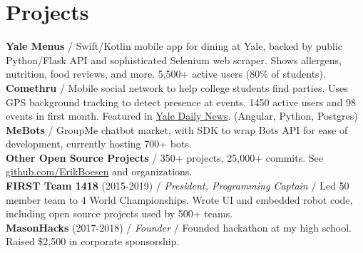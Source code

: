 \documentclass[10pt, a4paper]{article}
\newcommand{\years}[1]{\marginnote{\scriptsize #1}}
\begin{document}
\section*{Projects}
\textbf{Yale Menus} / Swift/Kotlin mobile app for dining at Yale, backed by public Python/Flask API and sophisticated Selenium web scraper. Shows allergens, nutrition, food reviews, and more. 5,500+ active users (80\% of students).\\
\textbf{Comethru} / Mobile social network to help college students find parties. Uses GPS background tracking to detect presence at events. 1450 active users and 98 events in first month. Featured in \href{https://yaledailynews.com/blog/2020/01/22/new-events-app-comethru-launches}{Yale Daily News}. (Angular, Python, Postgres)\\
\textbf{MeBots} / GroupMe chatbot market, with SDK to wrap Bots API for ease of development, currently hosting 700+ bots.\\
\textbf{Other Open Source Projects} / 350+ projects, 25,000+ commits. See \href{https://github.com/ErikBoesen}{github.com/ErikBoesen} and organizations.\\
\textbf{FIRST Team 1418} (2015-2019) / \textit{President, Programming Captain} / Led 50 member team to 4 World Championships. Wrote UI and embedded robot code, including open source projects used by 500+ teams.\\
\textbf{MasonHacks} (2017-2018) / \textit{Founder} / Founded hackathon at my high school. Raised \$2,500 in corporate sponsorship.\\

\vspace{-7mm}
\end{document}
